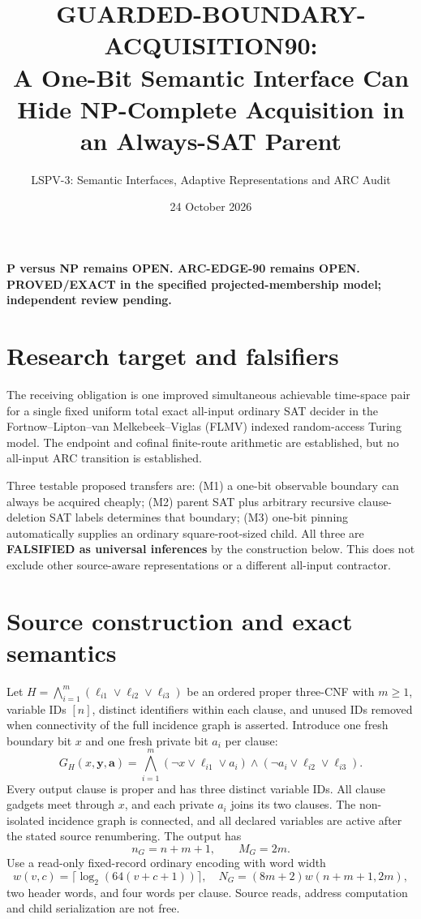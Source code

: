 \documentclass[11pt]{article}
\title{GUARDED-BOUNDARY-ACQUISITION90:\\A One-Bit Semantic Interface Can Hide NP-Complete Acquisition in an Always-SAT Parent}
\author{LSPV-3: Semantic Interfaces, Adaptive Representations and ARC Audit}
\date{24 October 2026}
\begin{document}
\maketitle
\begin{center}
\textbf{P versus NP remains OPEN. ARC-EDGE-90 remains OPEN.}\\
\textbf{PROVED/EXACT in the specified projected-membership model; independent review pending.}
\end{center}
\section{Research target and falsifiers}
The receiving obligation is one improved simultaneous achievable time-space pair for a single fixed uniform total exact all-input ordinary SAT decider in the Fortnow--Lipton--van Melkebeek--Viglas (FLMV) indexed random-access Turing model. The endpoint and cofinal finite-route arithmetic are established, but no all-input ARC transition is established.

Three testable proposed transfers are: (M1) a one-bit observable boundary can always be acquired cheaply; (M2) parent SAT plus arbitrary recursive clause-deletion SAT labels determines that boundary; (M3) one-bit pinning automatically supplies an ordinary square-root-sized child. All three are \textbf{FALSIFIED as universal inferences} by the construction below. This does not exclude other source-aware representations or a different all-input contractor.

\section{Source construction and exact semantics}
Let $H=\bigwedge_{i=1}^m(\ell_{i1}\vee\ell_{i2}\vee\ell_{i3})$ be an ordered proper three-CNF with $m\ge1$, variable IDs $[n]$, distinct identifiers within each clause, and unused IDs removed when connectivity of the full incidence graph is asserted. Introduce one fresh boundary bit $x$ and one fresh private bit $a_i$ per clause:
\[
 G_H(x,\mathbf y,\mathbf a)=\bigwedge_{i=1}^m
  (\neg x\vee\ell_{i1}\vee a_i)
  \wedge(\neg a_i\vee\ell_{i2}\vee\ell_{i3}).\tag{1}
\]
Every output clause is proper and has three distinct variable IDs. All clause gadgets meet through $x$, and each private $a_i$ joins its two clauses. The non-isolated incidence graph is connected, and all declared variables are active after the stated source renumbering. The output has
\[
 n_G=n+m+1,\qquad M_G=2m.
\]
Use a read-only fixed-record ordinary encoding with word width
\[
 w(v,c)=\lceil\log_2(64(v+c+1))\rceil,\quad
 N_G=(8m+2)w(n+m+1,2m),
\]
two header words, and four words per clause. Source reads, address computation and child serialization are not free.
\end{document}
